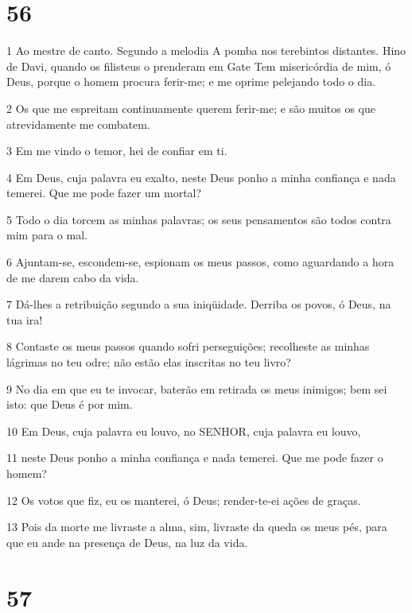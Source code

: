 \chapter{56}

\par 1 Ao mestre de canto. Segundo a melodia A pomba nos terebintos distantes. Hino de Davi, quando os filisteus o prenderam em Gate Tem misericórdia de mim, ó Deus, porque o homem procura ferir-me; e me oprime pelejando todo o dia.
\par 2 Os que me espreitam continuamente querem ferir-me; e são muitos os que atrevidamente me combatem.
\par 3 Em me vindo o temor, hei de confiar em ti.
\par 4 Em Deus, cuja palavra eu exalto, neste Deus ponho a minha confiança e nada temerei. Que me pode fazer um mortal?
\par 5 Todo o dia torcem as minhas palavras; os seus pensamentos são todos contra mim para o mal.
\par 6 Ajuntam-se, escondem-se, espionam os meus passos, como aguardando a hora de me darem cabo da vida.
\par 7 Dá-lhes a retribuição segundo a sua iniqüidade. Derriba os povos, ó Deus, na tua ira!
\par 8 Contaste os meus passos quando sofri perseguições; recolheste as minhas lágrimas no teu odre; não estão elas inscritas no teu livro?
\par 9 No dia em que eu te invocar, baterão em retirada os meus inimigos; bem sei isto: que Deus é por mim.
\par 10 Em Deus, cuja palavra eu louvo, no SENHOR, cuja palavra eu louvo,
\par 11 neste Deus ponho a minha confiança e nada temerei. Que me pode fazer o homem?
\par 12 Os votos que fiz, eu os manterei, ó Deus; render-te-ei ações de graças.
\par 13 Pois da morte me livraste a alma, sim, livraste da queda os meus pés, para que eu ande na presença de Deus, na luz da vida.

\chapter{57}

